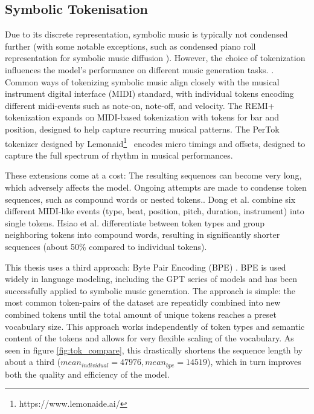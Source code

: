 \subsection{Symbolic Tokenisation} \label{section:symbolic_tok}
Due to its discrete representation, symbolic music is typically not condensed further (with some notable exceptions, such as condensed piano roll representation for symbolic music diffusion \cite{Min_Jiang_Xia_Zhao_polyffusion_2023}\cite{Zhu_Liu_Jiang_Zheng_texture_2024}). However, the choice of tokenization influences the model's performance on different music generation tasks. \cite{Fradet_Briot_Chhel_2021}. Common ways of tokenizing symbolic music align closely with the musical instrument digital interface (MIDI) standard, with individual tokens encoding different midi-events such as note-on, note-off, and velocity. The REMI+ \cite{Huang_Yang_remi_pop_transformer_2020} tokenization expands on MIDI-based tokenization with tokens for bar and position, designed to help capture recurring musical patterns. The PerTok tokenizer designed by Lemonaid\footnote{https://www.lemonaide.ai/}  encodes micro timings and offsets, designed to capture the full spectrum of rhythm in musical performances.

These extensions come at a cost: The resulting sequences can become very long, which adversely affects the model\cite{Ji_Yang_Luo_survey_symbolic_2024}. Ongoing attempts are made to condense token sequences, such as compound words or nested tokens.\cite{Ryu_Dong_nested_2024}. Dong et al.\cite{Dong_Chen_MMT_Kirkpatrick_2023} combine six different MIDI-like events (type, beat, position, pitch, duration, instrument) into single tokens. Hsiao et al.\cite{compound_word_Hsiao_Liu_Yeh_Yang_2021} differentiate between token types and group neighboring tokens into compound words, resulting in significantly shorter sequences (about 50\% compared to individual tokens). 

This thesis uses a third approach: Byte Pair Encoding (BPE) \cite{Sennrich_Haddow_Birch_BPE_2016}. BPE is used widely in language modeling, including the GPT series of models\cite{Radford_Wu_Child_Luan_gpt2_2019} and has been successfully applied to symbolic music generation.\cite{Fradet_Gutowski_Chhel_Briot_2023} The approach is simple: the most common token-pairs of the dataset are repeatidly combined into new combined tokens until the total amount of unique tokens reaches a preset vocabulary size. This approach works independently of token types and semantic content of the tokens and allows for very flexible scaling of the vocabulary. As seen in figure \ref{fig:tok_compare}, this drastically shortens the sequence length by about a third ($mean_{individual}=47976, mean_{bpe}=14519$), which in turn improves both the quality and efficiency of the model. 

